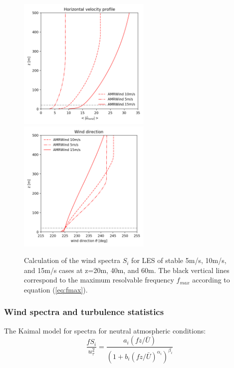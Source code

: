 \begin{figure}[hbt!]
  \label{fig:CompareAMRallWS}
  \centering
  \includegraphics[width=2.5in]{figures/AMRWind_allWS/AMRWind_stable_WS.png}
  \includegraphics[width=2.5in]{figures/AMRWind_allWS/AMRWind_stable_WDir.png}
  \caption{Calculation of the wind spectra $S_i$ for LES of stable
    5m/s, 10m/s, and 15m/s cases at z=20m, 40m, and 60m.  The black
    vertical lines correspond to the maximum resolvable frequency
    $f_{max}$ according to equation (\ref{eq:fmax}). }
\end{figure}

\subsubsection{Wind spectra and turbulence statistics}

The Kaimal model for spectra \cite{kaimal1973turbulence,
  cheynet2017spectral} for neutral atmospheric conditions:
\begin{equation}
  \label{eq:kaimal}
  \frac{fS_i}{u_\tau^2} = \frac{a_i(fz/\bar{U})}{\left(1+b_i(fz/\bar{U})^{\alpha_i}\right)^{\beta_i}}
\end{equation}

